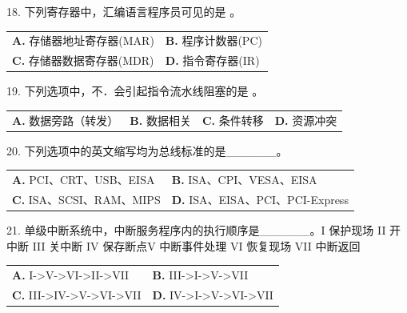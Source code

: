\documentclass[UTF8,11pt]{ctexart}
\begin{document}
18. 下列寄存器中，汇编语言程序员可见的是 。


\begin{center}\begin{tabular}{>{\raggedright\arraybackslash}p{\dimexpr(\linewidth-4\tabcolsep)/2\relax}>{\raggedright\arraybackslash}p{\dimexpr(\linewidth-4\tabcolsep)/2\relax}}
\textbf{A.} 存储器地址寄存器(MAR) & \textbf{B.} 程序计数器(PC)\\[.35em]
\textbf{C.} 存储器数据寄存器(MDR) & \textbf{D.} 指令寄存器(IR)\\[.35em]\end{tabular}\end{center}

19. 下列选项中，不．会引起指令流水线阻塞的是 。


\begin{center}\begin{tabular}{>{\raggedright\arraybackslash}p{\dimexpr(\linewidth-8\tabcolsep)/4\relax}>{\raggedright\arraybackslash}p{\dimexpr(\linewidth-8\tabcolsep)/4\relax}>{\raggedright\arraybackslash}p{\dimexpr(\linewidth-8\tabcolsep)/4\relax}>{\raggedright\arraybackslash}p{\dimexpr(\linewidth-8\tabcolsep)/4\relax}}
\textbf{A.} 数据旁路（转发） & \textbf{B.} 数据相关 & \textbf{C.} 条件转移 & \textbf{D.} 资源冲突\\[.35em]\end{tabular}\end{center}

20. 下列选项中的英文缩写均为总线标准的是\_\_\_\_\_\_。


\begin{center}\begin{tabular}{>{\raggedright\arraybackslash}p{\dimexpr(\linewidth-4\tabcolsep)/2\relax}>{\raggedright\arraybackslash}p{\dimexpr(\linewidth-4\tabcolsep)/2\relax}}
\textbf{A.} PCI、CRT、USB、EISA & \textbf{B.} ISA、CPI、VESA、EISA\\[.35em]
\textbf{C.} ISA、SCSI、RAM、MIPS & \textbf{D.} ISA、EISA、PCI、PCI-Express\\[.35em]\end{tabular}\end{center}

21. 单级中断系统中，中断服务程序内的执行顺序是\_\_\_\_\_\_。I 保护现场 II 开中断 III 关中断 IV 保存断点V 中断事件处理 VI 恢复现场 VII 中断返回


\begin{center}\begin{tabular}{>{\raggedright\arraybackslash}p{\dimexpr(\linewidth-4\tabcolsep)/2\relax}>{\raggedright\arraybackslash}p{\dimexpr(\linewidth-4\tabcolsep)/2\relax}}
\textbf{A.} I->V->VI->II->VII & \textbf{B.} III->I->V->VII\\[.35em]
\textbf{C.} III->IV->V->VI->VII & \textbf{D.} IV->I->V->VI->VII\\[.35em]\end{tabular}\end{center}
\end{document}
